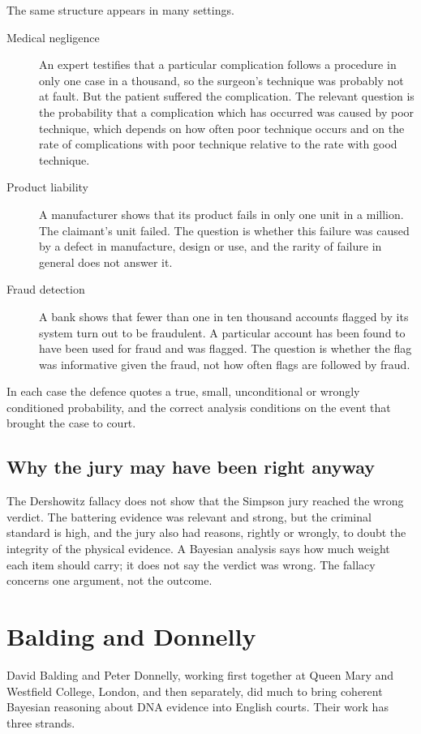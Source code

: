 The same structure appears in many settings.
\begin{description}
\item[{\mdseries Medical negligence}] An expert testifies that a particular complication follows a procedure in only one case in a thousand, so the surgeon's technique was probably not at fault. But the patient suffered the complication. The relevant question is the probability that a complication which has occurred was caused by poor technique, which depends on how often poor technique occurs and on the rate of complications with poor technique relative to the rate with good technique.
\item[{\mdseries Product liability}] A manufacturer shows that its product fails in only one unit in a million. The claimant's unit failed. The question is whether this failure was caused by a defect in manufacture, design or use, and the rarity of failure in general does not answer it.
\item[{\mdseries Fraud detection}] A bank shows that fewer than one in ten thousand accounts flagged by its system turn out to be fraudulent. A particular account has been found to have been used for fraud and was flagged. The question is whether the flag was informative given the fraud, not how often flags are followed by fraud.
\end{description}
In each case the defence quotes a true, small, unconditional or wrongly conditioned probability, and the correct analysis conditions on the event that brought the case to court.

\subsection{Why the jury may have been right anyway}

The Dershowitz fallacy does not show that the Simpson jury reached the wrong verdict. The battering evidence was relevant and strong, but the criminal standard is high, and the jury also had reasons, rightly or wrongly, to doubt the integrity of the physical evidence. A Bayesian analysis says how much weight each item should carry; it does not say the verdict was wrong. The fallacy concerns one argument, not the outcome.

\section{Balding and Donnelly}

David Balding and Peter Donnelly, working first together at Queen Mary and Westfield College, London, and then separately, did much to bring coherent Bayesian reasoning about DNA evidence into English courts. Their work has three strands.

